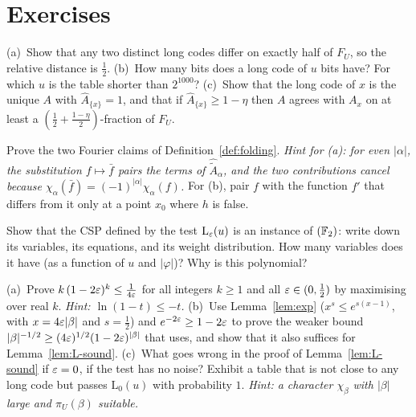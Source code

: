 \section*{Exercises}

\begin{exercise}[\stars{$\star$}]\label{ex:longcode-distance}
(a)~Show that any two distinct long codes differ on exactly half of $F_U$, so the relative distance is $\tfrac12$.
(b)~How many bits does a long code of $u$ bits have?  For which $u$ is the table shorter than $2^{1000}$?
(c)~Show that the long code of $x$ is the unique $A$ with $\widehat A_{\{x\}}=1$, and that if $\widehat A_{\{x\}}\ge1-\eta$ then $A$ agrees with $A_x$ on at least a $(\tfrac12+\tfrac{1-\eta}{2})$-fraction of $F_U$.
\end{exercise}

\begin{exercise}[\stars{$\star\star$}]\label{ex:folding}
Prove the two Fourier claims of Definition~\ref{def:folding}.  \emph{Hint for (a): for even $|\alpha|$, the substitution $f\mapsto\bar f$ pairs the terms of $\widehat{\tilde A}_\alpha$, and the two contributions cancel because $\chi_\alpha(\bar f)=(-1)^{|\alpha|}\chi_\alpha(f)$.}
For (b), pair $f$ with the function $f'$ that differs from it only at a point $x_0$ where $h$ is false.
\end{exercise}

\begin{exercise}[\stars{$\star$}]\label{ex:testL-is-lin}
Show that the CSP defined by the test $\mathrm{L}_\varepsilon(u)$ is an instance of $(\mathbb{F}_2)$: write down its variables, its equations, and its weight distribution.  How many variables does it have (as a function of $u$ and $|\varphi|$)?  Why is this polynomial?
\end{exercise}

\begin{exercise}[\stars{$\star\star$}]\label{ex:key-ineq}
(a)~Prove $k\,(1-2\varepsilon)^k\le\frac1{4\varepsilon}$ for all integers $k\ge1$ and all $\varepsilon\in(0,\tfrac12)$ by maximising over real $k$.  \emph{Hint: $\ln(1-t)\le-t$.}
(b)~Use Lemma~\ref{lem:exp} ($x^s\le e^{s(x-1)}$, with $x=4\varepsilon|\beta|$ and $s=\frac12$) and $e^{-2\varepsilon}\ge1-2\varepsilon$ to prove the weaker bound $|\beta|^{-1/2}\ge(4\varepsilon)^{1/2}(1-2\varepsilon)^{|\beta|}$ that \cite{Hastad01} uses, and show that it also suffices for Lemma~\ref{lem:L-sound}.
(c)~What goes wrong in the proof of Lemma~\ref{lem:L-sound} if $\varepsilon=0$, \ie if the test has no noise?  Exhibit a table that is not close to any long code but passes $\mathrm{L}_0(u)$ with probability $1$.  \emph{Hint: a character $\chi_\beta$ with $|\beta|$ large and $\pi_U(\beta)$ suitable.}
\end{exercise}

